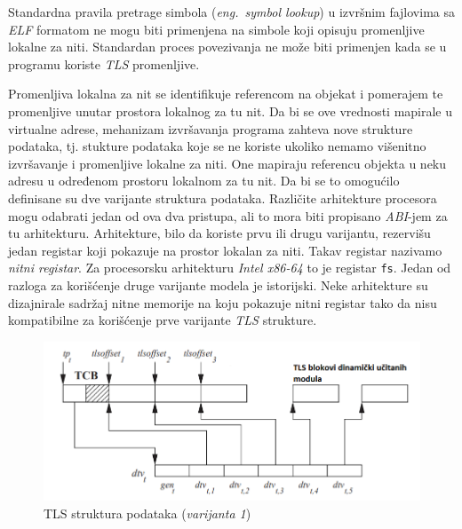 \documentclass[12pt,oneside]{memoir}
\begin{document}
Standardna pravila pretrage simbola (\emph{eng.~symbol lookup}) u izvršnim fajlovima sa \emph{ELF} formatom ne mogu biti primenjena na simbole koji opisuju promenljive lokalne za niti. Standardan proces povezivanja ne može biti primenjen kada se u programu koriste \emph{TLS} promenljive.

Promenljiva lokalna za nit se identifikuje referencom na objekat i pomerajem te promenljive unutar prostora lokalnog za tu nit. Da bi se ove vrednosti mapirale u virtualne adrese, mehanizam izvršavanja programa zahteva nove strukture podataka, tj. stukture podataka koje se ne koriste ukoliko nemamo višenitno izvršavanje i promenljive lokalne za niti. One mapiraju referencu objekta u neku adresu u određenom prostoru lokalnom za tu nit. Da bi se to omogućilo definisane su dve varijante struktura podataka. Različite arhitekture procesora mogu odabrati jedan od ova dva pristupa, ali to mora biti propisano \emph{ABI}-jem za tu arhitekturu. Arhitekture, bilo da koriste prvu ili drugu varijantu, rezervišu jedan registar koji pokazuje na prostor lokalan za niti. Takav registar nazivamo \emph{nitni registar}. Za procesorsku arhitekturu \emph{Intel x86-64} to je registar \texttt{fs}. Jedan od razloga za korišćenje druge varijante modela je istorijski. Neke arhitekture su dizajnirale sadržaj nitne memorije na koju pokazuje nitni registar tako da nisu kompatibilne za korišćenje prve varijante \emph{TLS} strukture.

\begin{figure}[h!]
	\begin{center}
		\includegraphics[scale=0.6]{slike/TLSModelV1.png}
	\end{center}
	\caption{TLS struktura podataka (\emph{varijanta 1})}
	\label{fig:tls_model1}
\end{figure}
\end{document}
